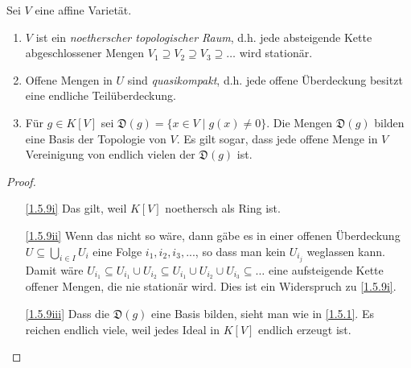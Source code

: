 \documentclass[a4paper,12pt]{scrbook}
\theoremstyle{keinenummern} %
\theoremstyle{mitnummern}
\theoremstyle{unserbeweis}
\newtheorem{proof}{Beweis}
\newcommand{\D}{\mathfrak{D}}
\renewcommand{\dotsc}{\ensuremath{\!...}}
\begin{document}
\begin{bem}\label{1.5.9}
  Sei $V$ eine affine Varietät.
  \begin{enumerate}
  \item{} $V$ ist ein \emph{noetherscher topologischer Raum}, d.h. jede absteigende Kette abgeschlossener Mengen
    $V_1\supseteq V_2\supseteq V_3\supseteq\dotso$ wird stationär.
  \item{} Offene Mengen in $U$ sind \emph{quasikompakt}, d.h. jede offene Überdeckung besitzt eine endliche
    Teilüberdeckung.
  \item{} Für $g\in K[V]$ sei $\D(g)=\{x\in V\mid g(x)\neq0\}$. Die Mengen $\D(g)$ bilden eine Basis der Topologie
    von $V$. Es gilt sogar, dass jede offene Menge in $V$ Vereinigung von endlich vielen der $\D(g)$ ist.
  \end{enumerate}
\end{bem}
\begin{proof}
  \begin{enumerate}
  \item[\ref{1.5.9i}] Das gilt, weil $K[V]$ noethersch als Ring ist.
  \item[\ref{1.5.9ii}] Wenn das nicht so wäre, dann gäbe es in einer offenen Überdeckung $U\subseteq\bigcup_{i\in I}U_i$ eine
    Folge $i_1,i_2,i_3,\dotsc$, so dass man kein $U_{i_j}$ weglassen kann. Damit wäre $U_{i_1}\subseteq U_{i_1}\cup U_{i_2}
    \subseteq U_{i_1}\cup U_{i_2}\cup U_{i_3}\subseteq \dotso$ eine aufsteigende Kette offener Mengen, die nie stationär
    wird. Dies ist ein Widerspruch zu \ref{1.5.9i}.
  \item[\ref{1.5.9iii}] Dass die $\D(g)$ eine Basis bilden, sieht man wie in \cref{1.5.1}. Es reichen endlich viele, weil
    jedes Ideal in $K[V]$ endlich erzeugt ist.
  \end{enumerate}
\end{proof}

\end{document}
